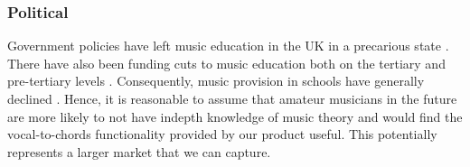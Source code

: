 \subsubsection{Political}
Government policies have left music education in the UK in a precarious state \cite{perilousstate}. There have also been funding cuts to music education both on the tertiary and pre-tertiary levels \cite{weale2021} \cite{macdonald2021}. Consequently, music provision in schools have generally declined \cite{brown2018} \cite{weale2018}. Hence, it is reasonable to assume that amateur musicians in the future are more likely to not have in\-depth knowledge of music theory and would find the vocal-to-chords functionality provided by our product useful. This potentially represents a larger market that we can capture.

